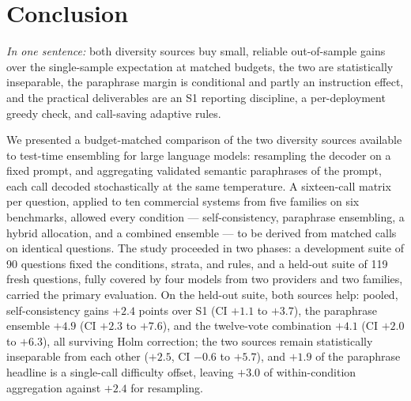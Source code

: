 \section{Conclusion}
\label{sec:conclusion}

\emph{In one sentence:} both diversity sources buy small, reliable out-of-sample gains over the single-sample expectation at matched budgets, the two are statistically inseparable, the paraphrase margin is conditional and partly an instruction effect, and the practical deliverables are an S1 reporting discipline, a per-deployment greedy check, and call-saving adaptive rules.

We presented a budget-matched comparison of the two diversity sources available to test-time ensembling for large language models: resampling the decoder on a fixed prompt, and aggregating validated semantic paraphrases of the prompt, each call decoded stochastically at the same temperature. A sixteen-call matrix per question, applied to ten commercial systems from five families on six benchmarks, allowed every condition --- self-consistency, paraphrase ensembling, a hybrid allocation, and a combined ensemble --- to be derived from matched calls on identical questions. The study proceeded in two phases: a development suite of 90 questions fixed the conditions, strata, and rules, and a held-out suite of 119 fresh questions, fully covered by four models from two providers and two families, carried the primary evaluation. On the held-out suite, both sources help: pooled, self-consistency gains $+2.4$ points over S1 (CI $+1.1$ to $+3.7$), the paraphrase ensemble $+4.9$ (CI $+2.3$ to $+7.6$), and the twelve-vote combination $+4.1$ (CI $+2.0$ to $+6.3$), all surviving Holm correction; the two sources remain statistically inseparable from each other ($+2.5$, CI $-0.6$ to $+5.7$), and $+1.9$ of the paraphrase headline is a single-call difficulty offset, leaving $+3.0$ of within-condition aggregation against $+2.4$ for resampling.

